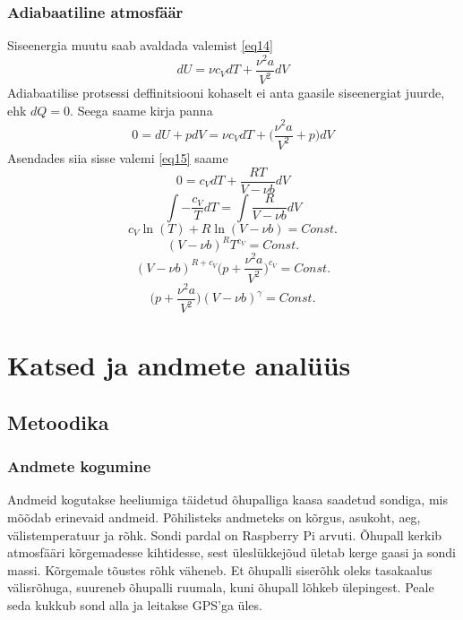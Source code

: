 \documentclass{trkut}%
\begin{document}
\subsection{Adiabaatiline atmosfäär}
Siseenergia muutu saab avaldada valemist \ref{eq14}
\begin{equation*}
dU = \nu c_VdT + \frac{\nu^2 a}{V^2}dV
\end{equation*}
Adiabaatilise protsessi deffinitsiooni kohaselt ei anta gaasile siseenergiat juurde, ehk $dQ = 0$. Seega saame kirja panna
\begin{equation*}
0 = dU + pdV = \nu c_V dT + \bigg( \frac{\nu^2 a}{V^2} + p \bigg) dV
\end{equation*}
Asendades siia sisse valemi \ref{eq15} saame
\begin{equation*}
0 = c_V dT + \frac{RT}{V - \nu b}dV
\end{equation*}
\begin{equation*}
\int - \frac{c_V}{T} dT = \int \frac{R}{V - \nu b}dV
\end{equation*}
\begin{equation*}
c_V \ln(T) + R \ln(V - \nu b) = Const.
\end{equation*}
\begin{equation*}
(V - \nu b)^R T^{c_V} = Const.
\end{equation*}
\begin{equation*}
(V - \nu b)^{R + c_V} \bigg( p + \frac{\nu^2 a}{V^2} \bigg)^{c_V} = Const.
\end{equation*}
\begin{equation*}
 \bigg( p + \frac{\nu^2 a}{V^2} \bigg) (V - \nu b)^\gamma = Const.
\end{equation*}


\chapter{Katsed ja andmete analüüs}
\section{Metoodika}
\subsection{Andmete kogumine}
Andmeid kogutakse heeliumiga täidetud õhupalliga kaasa saadetud sondiga, mis mõõdab erinevaid andmeid. Põhilisteks andmeteks on kõrgus, asukoht, aeg, välistemperatuur ja rõhk. Sondi pardal on Raspberry Pi arvuti. Õhupall kerkib atmosfääri kõrgemadesse kihtidesse, sest üleslükkejõud ületab kerge gaasi ja sondi massi. Kõrgemale tõustes rõhk väheneb. Et õhupalli siserõhk oleks tasakaalus välisrõhuga, suureneb õhupalli ruumala, kuni õhupall lõhkeb ülepingest. Peale seda kukkub sond alla ja leitakse GPS'ga üles.
\end{document}
